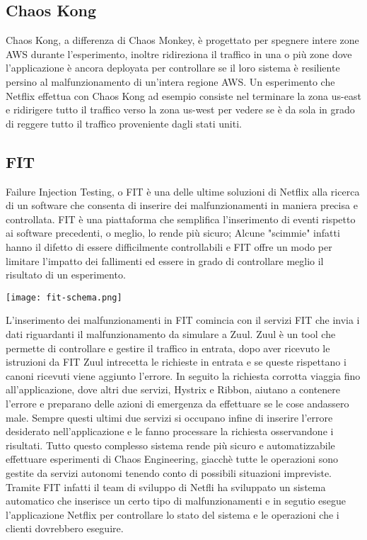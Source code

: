 \subsection{Chaos Kong}
Chaos Kong, a differenza di Chaos Monkey, è progettato per spegnere intere zone AWS durante l'esperimento, inoltre ridireziona il traffico in una o più zone dove l'applicazione è ancora deployata per controllare se il loro sistema è resiliente persino al malfunzionamento di un'intera regione AWS.
Un esperimento che Netflix effettua con Chaos Kong ad esempio consiste nel terminare la zona us-east e ridirigere tutto il traffico verso la zona us-west per vedere se è da sola in grado di reggere tutto il traffico proveniente dagli stati uniti.

\subsection{FIT}
Failure Injection Testing, o FIT è una delle ultime soluzioni di Netflix alla ricerca di un software che consenta di inserire dei malfunzionamenti in maniera precisa e controllata.
FIT è una piattaforma che semplifica l'inserimento di eventi rispetto ai software precedenti, o meglio, lo rende più sicuro; Alcune "scimmie" infatti hanno il difetto di essere difficilmente controllabili e FIT offre un modo per limitare l'impatto dei fallimenti ed essere in grado di controllare meglio il risultato di un esperimento.
\begin{center}
    \centering
    \texttt{[image: fit-schema.png]}
    \label{tab:fitschema}
\end{center}
L'inserimento dei malfunzionamenti in FIT comincia con il servizi FIT che invia i dati riguardanti il malfunzionamento da simulare a Zuul.
Zuul è un tool che permette di controllare e gestire il traffico in entrata, dopo aver ricevuto le istruzioni da FIT Zuul intrecetta le richieste in entrata e se queste rispettano i canoni ricevuti viene aggiunto l'errore.
In seguito la richiesta corrotta viaggia fino all'applicazione, dove altri due servizi, Hystrix e Ribbon, aiutano a contenere l'errore e preparano delle azioni di emergenza da effettuare se le cose andassero male.
Sempre questi ultimi due servizi si occupano infine di inserire l'errore desiderato nell'applicazione e le fanno processare la richiesta osservandone i risultati.
Tutto questo complesso sistema rende più sicuro e automatizzabile effettuare esperimenti di Chaos Engineering, giacchè tutte le operazioni sono gestite da servizi autonomi tenendo conto di possibili situazioni impreviste.
Tramite FIT infatti il team di sviluppo di Netfli ha sviluppato un sistema automatico che inserisce un certo tipo di malfunzionamenti e in segutio esegue l'applicazione Netflix per controllare lo stato del sistema e le operazioni che i clienti dovrebbero eseguire.


